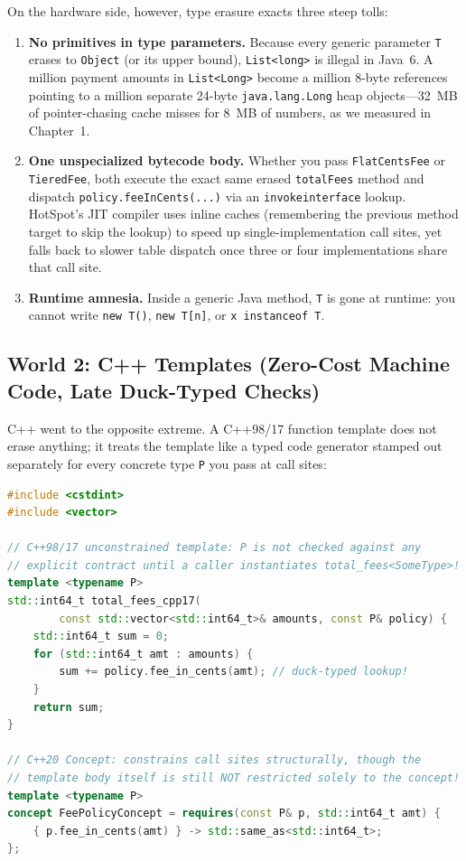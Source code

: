 On the hardware side, however, type erasure exacts three steep tolls:
\begin{enumerate}
  \item \textbf{No primitives in type parameters.} Because every generic parameter \texttt{T} erases to \texttt{Object} (or its upper bound), \texttt{List<long>} is illegal in Java~6. A million payment amounts in \texttt{List<Long>} become a million 8-byte references pointing to a million separate 24-byte \texttt{java.lang.Long} heap objects---32~MB of pointer-chasing cache misses for 8~MB of numbers, as we measured in Chapter~1.
  \item \textbf{One unspecialized bytecode body.} Whether you pass \texttt{FlatCentsFee} or \texttt{TieredFee}, both execute the exact same erased \texttt{totalFees} method and dispatch \texttt{policy.feeInCents(...)} via an \texttt{invokeinterface} lookup. HotSpot's JIT compiler uses inline caches (remembering the previous method target to skip the lookup) to speed up single-implementation call sites, yet falls back to slower table dispatch once three or four implementations share that call site.
  \item \textbf{Runtime amnesia.} Inside a generic Java method, \texttt{T} is gone at runtime: you cannot write \texttt{new T()}, \texttt{new T[n]}, or \texttt{x instanceof T}.
\end{enumerate}

\subsection{World 2: C++ Templates (Zero-Cost Machine Code, Late Duck-Typed Checks)}

C++ went to the opposite extreme. A C++98/17 function template does not erase anything; it treats the template like a typed code generator stamped out separately for every concrete type \texttt{P} you pass at call sites:

\begin{lstlisting}[language=C++, caption={C++98/17 unconstrained template vs C++20 Concept constraint.}]
#include <cstdint>
#include <vector>

// C++98/17 unconstrained template: P is not checked against any
// explicit contract until a caller instantiates total_fees<SomeType>!
template <typename P>
std::int64_t total_fees_cpp17(
        const std::vector<std::int64_t>& amounts, const P& policy) {
    std::int64_t sum = 0;
    for (std::int64_t amt : amounts) {
        sum += policy.fee_in_cents(amt); // duck-typed lookup!
    }
    return sum;
}

// C++20 Concept: constrains call sites structurally, though the
// template body itself is still NOT restricted solely to the concept!
template <typename P>
concept FeePolicyConcept = requires(const P& p, std::int64_t amt) {
    { p.fee_in_cents(amt) } -> std::same_as<std::int64_t>;
};
\end{lstlisting}


